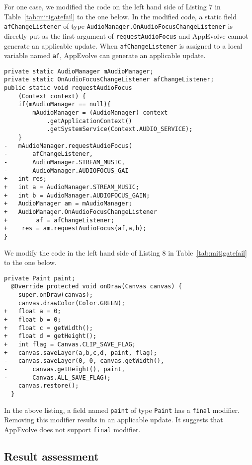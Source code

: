 For one case, we modified the code on the left hand side of Listing 7 in Table~\ref{tab:mitigatefail} to the one below. In the modified code, a static field {\tt afChangeListener} of type {\tt AudioManager.OnAudioFocusChangeListener} is directly put as the first argument of {\tt requestAudioFocus} and AppEvolve cannot generate an applicable update. When {\tt afChangeListener} is assigned to a local variable named {\tt af}, AppEvolve can generate an applicable update.
\begin{lstlisting}[language=text,numbers=none]
private static AudioManager mAudioManager;
private static OnAudioFocusChangeListener afChangeListener;
public static void requestAudioFocus
    (Context context) {
    if(mAudioManager == null){
        mAudioManager = (AudioManager) context
            .getApplicationContext()
            .getSystemService(Context.AUDIO_SERVICE);
    }
-   mAudioManager.requestAudioFocus(
-       afChangeListener,
-       AudioManager.STREAM_MUSIC,
-       AudioManager.AUDIOFOCUS_GAI
+   int res;
+   int a = AudioManager.STREAM_MUSIC;
+   int b = AudioManager.AUDIOFOCUS_GAIN;
+   AudioManager am = mAudioManager;
+   AudioManager.OnAudioFocusChangeListener
+        af = afChangeListener;
+    res = am.requestAudioFocus(af,a,b);
}

\end{lstlisting}


We modify the code in the left hand side of Listing 8 in Table~\ref{tab:mitigatefail} to the one below.
\begin{lstlisting}[language=text,numbers=none]
private Paint paint;
  @Override protected void onDraw(Canvas canvas) {
    super.onDraw(canvas);
    canvas.drawColor(Color.GREEN);
+   float a = 0;
+   float b = 0;
+   float c = getWidth();
+   float d = getHeight();
+   int flag = Canvas.CLIP_SAVE_FLAG;
+   canvas.saveLayer(a,b,c,d, paint, flag);
-   canvas.saveLayer(0, 0, canvas.getWidth(),
-       canvas.getHeight(), paint,
-       Canvas.ALL_SAVE_FLAG);
    canvas.restore();
  }
\end{lstlisting}
In the above listing, a field named {\tt paint} of type {\tt Paint} has a {\tt final} modifier. Removing this modifier results in an applicable update. It suggests that AppEvolve does not support {\tt final} modifier.

\subsection{Result assessment}

